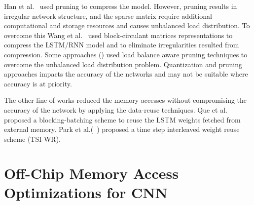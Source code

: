 \documentclass[a4paper,10pt]{article}
\begin{document}
Han et al.~\cite{han2017ese} used pruning to compress the model. However, pruning results in irregular network structure, and the sparse matrix require additional computational and storage resources and causes unbalanced load distribution. To overcome this Wang et al.~\cite{wang2018c} used block-circulant matrices representations to compress the LSTM/RNN model and to eliminate irregularities resulted from compression. Some approaches (\cite{park2019balancing,han2017ese,park2018maximizing}) used load balance aware pruning techniques to overcome the unbalanced load distribution problem. Quantization and pruning approaches impacts the accuracy of the networks and may not be suitable where accuracy is at priority. 

The other line of works reduced the memory accesses without compromising the accuracy of the network by applying the data-reuse techniques. Que et al.~\cite{que2019efficient} proposed a blocking-batching scheme to reuse the LSTM weights fetched from external memory. Park et al.(~\cite{park2020time}) proposed a time step interleaved weight reuse scheme (TSI-WR). 

\section{Off-Chip Memory Access Optimizations for CNN}
\end{document}
